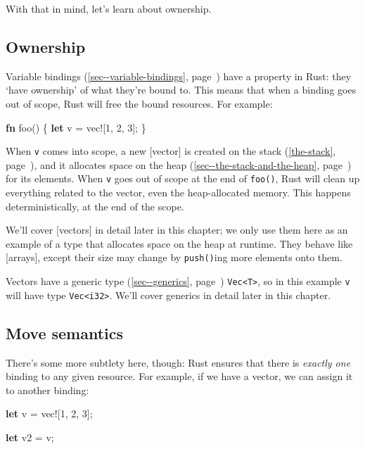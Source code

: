 \documentclass[a4paper,]{book}
\renewcommand*{\hyperref}[2][\ar]{%
  \def\ar{#2}%
  #2 (\autoref{#1}, page~\pageref{#1})}
\newenvironment{Shaded}{\begin{snugshade}}{\end{snugshade}}
\newcommand{\KeywordTok}[1]{\textcolor[rgb]{0.13,0.29,0.53}{\textbf{{#1}}}}
\newcommand{\DecValTok}[1]{\textcolor[rgb]{0.00,0.00,0.81}{{#1}}}
\newcommand{\OtherTok}[1]{\textcolor[rgb]{0.56,0.35,0.01}{{#1}}}
\newcommand{\NormalTok}[1]{{#1}}
\begin{document}
With that in mind, let's learn about ownership.

\subsection{Ownership}\label{ownership}

\hyperref[sec--variable-bindings]{Variable bindings} have a property in
Rust: they `have ownership' of what they're bound to. This means that
when a binding goes out of scope, Rust will free the bound resources.
For example:

\begin{Shaded}
\begin{Highlighting}[]
\KeywordTok{fn} \NormalTok{foo() \{}
    \KeywordTok{let} \NormalTok{v = }\OtherTok{vec!}\NormalTok{[}\DecValTok{1}\NormalTok{, }\DecValTok{2}\NormalTok{, }\DecValTok{3}\NormalTok{];}
\NormalTok{\}}
\end{Highlighting}
\end{Shaded}

When \texttt{v} comes into scope, a new {[}vector{]} is created on
\hyperref[the-stack]{the stack}, and it allocates space on
\hyperref[sec--the-stack-and-the-heap]{the heap} for its elements. When
\texttt{v} goes out of scope at the end of \texttt{foo()}, Rust will
clean up everything related to the vector, even the heap-allocated
memory. This happens deterministically, at the end of the scope.

We'll cover {[}vectors{]} in detail later in this chapter; we only use
them here as an example of a type that allocates space on the heap at
runtime. They behave like {[}arrays{]}, except their size may change by
\texttt{push()}ing more elements onto them.

Vectors have a \hyperref[sec--generics]{generic type}
\texttt{Vec\textless{}T\textgreater{}}, so in this example \texttt{v}
will have type \texttt{Vec\textless{}i32\textgreater{}}. We'll cover
generics in detail later in this chapter.

\subsection{Move semantics}\label{move-semantics}

There's some more subtlety here, though: Rust ensures that there is
\emph{exactly one} binding to any given resource. For example, if we
have a vector, we can assign it to another binding:

\begin{Shaded}
\begin{Highlighting}[]
\KeywordTok{let} \NormalTok{v = }\OtherTok{vec!}\NormalTok{[}\DecValTok{1}\NormalTok{, }\DecValTok{2}\NormalTok{, }\DecValTok{3}\NormalTok{];}

\KeywordTok{let} \NormalTok{v2 = v;}
\end{Highlighting}
\end{Shaded}
\end{document}
